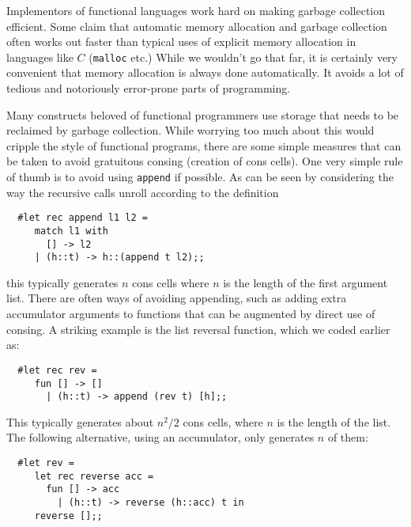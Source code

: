 Implementors of functional languages work hard on making garbage collection
efficient. Some claim that automatic memory allocation and garbage collection
often works out faster than typical uses of explicit memory allocation in
languages like $C$ ({\tt malloc} etc.) While we wouldn't go that far, it is
certainly very convenient that memory allocation is always done automatically.
It avoids a lot of tedious and notoriously error-prone parts of programming.

Many constructs beloved of functional programmers use storage that needs to be
reclaimed by garbage collection. While worrying too much about this would
cripple the style of functional programs, there are some simple measures that
can be taken to avoid gratuitous consing (creation of cons cells). One very
simple rule of thumb is to avoid using {\tt append} if possible. As can be seen
by considering the way the recursive calls unroll according to the definition

\begin{boxed}\begin{verbatim}
  #let rec append l1 l2 =
     match l1 with
       [] -> l2
     | (h::t) -> h::(append t l2);;
\end{verbatim}\end{boxed}

\noindent this typically generates $n$ cons cells where $n$ is the length of
the first argument list. There are often ways of avoiding appending, such as
adding extra accumulator arguments to functions that can be augmented by direct
use of consing. A striking example is the list reversal function, which we
coded earlier as:

\begin{boxed}\begin{verbatim}
  #let rec rev =
     fun [] -> []
       | (h::t) -> append (rev t) [h];;
\end{verbatim}\end{boxed}

This typically generates about $n^2 / 2$ cons cells, where $n$ is the length of
the list. The following alternative, using an accumulator, only generates $n$
of them:

\begin{boxed}\begin{verbatim}
  #let rev =
     let rec reverse acc =
       fun [] -> acc
         | (h::t) -> reverse (h::acc) t in
     reverse [];;
\end{verbatim}\end{boxed}

